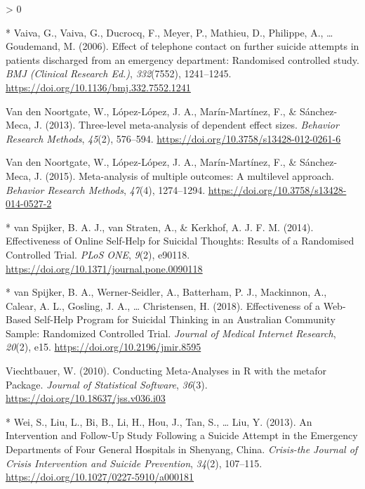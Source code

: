 \documentclass[
  english,
  man]{apa6}
\newlength{\cslhangindent}
\newenvironment{CSLReferences}[2] %
 {%
  \setlength{\parindent}{0pt}
  \ifodd #1 \everypar{\setlength{\hangindent}{\cslhangindent}}\ignorespaces\fi
  \ifnum #2 > 0
  \setlength{\parskip}{#2\baselineskip}
  \fi
 }%
 {}
\begin{document}
\begin{CSLReferences}{1}{0}
\leavevmode\hypertarget{ref-vaiva2006}{}%
* Vaiva, G., Vaiva, G., Ducrocq, F., Meyer, P., Mathieu, D., Philippe, A., \ldots{} Goudemand, M. (2006). Effect of telephone contact on further suicide attempts in patients discharged from an emergency department: {Randomised} controlled study. \emph{BMJ (Clinical Research Ed.)}, \emph{332}(7552), 1241--1245. \url{https://doi.org/10.1136/bmj.332.7552.1241}

\leavevmode\hypertarget{ref-vandennoortgate2013}{}%
Van den Noortgate, W., López-López, J. A., Marín-Martínez, F., \& Sánchez-Meca, J. (2013). Three-level meta-analysis of dependent effect sizes. \emph{Behavior Research Methods}, \emph{45}(2), 576--594. \url{https://doi.org/10.3758/s13428-012-0261-6}

\leavevmode\hypertarget{ref-vandennoortgate2015}{}%
Van den Noortgate, W., López-López, J. A., Marín-Martínez, F., \& Sánchez-Meca, J. (2015). Meta-analysis of multiple outcomes: {A} multilevel approach. \emph{Behavior Research Methods}, \emph{47}(4), 1274--1294. \url{https://doi.org/10.3758/s13428-014-0527-2}

\leavevmode\hypertarget{ref-vanspijker2014}{}%
* van Spijker, B. A. J., van Straten, A., \& Kerkhof, A. J. F. M. (2014). Effectiveness of {Online Self-Help} for {Suicidal Thoughts}: {Results} of a {Randomised Controlled Trial}. \emph{PLoS ONE}, \emph{9}(2), e90118. \url{https://doi.org/10.1371/journal.pone.0090118}

\leavevmode\hypertarget{ref-vanspijker2018}{}%
* van Spijker, B. A., Werner-Seidler, A., Batterham, P. J., Mackinnon, A., Calear, A. L., Gosling, J. A., \ldots{} Christensen, H. (2018). Effectiveness of a {Web-Based Self-Help Program} for {Suicidal Thinking} in an {Australian Community Sample}: {Randomized Controlled Trial}. \emph{Journal of Medical Internet Research}, \emph{20}(2), e15. \url{https://doi.org/10.2196/jmir.8595}

\leavevmode\hypertarget{ref-viechtbauer2010c}{}%
Viechtbauer, W. (2010). Conducting {Meta-Analyses} in {R} with the metafor {Package}. \emph{Journal of Statistical Software}, \emph{36}(3). \url{https://doi.org/10.18637/jss.v036.i03}

\leavevmode\hypertarget{ref-wei2013}{}%
* Wei, S., Liu, L., Bi, B., Li, H., Hou, J., Tan, S., \ldots{} Liu, Y. (2013). An {Intervention} and {Follow-Up Study Following} a {Suicide Attempt} in the {Emergency Departments} of {Four General Hospitals} in {Shenyang}, {China}. \emph{Crisis-the Journal of Crisis Intervention and Suicide Prevention}, \emph{34}(2), 107--115. \url{https://doi.org/10.1027/0227-5910/a000181}


\end{CSLReferences}
\end{document}
